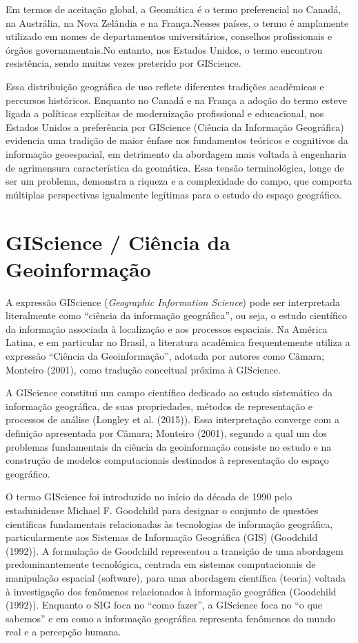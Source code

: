 \documentclass[
  letterpaper,
  DIV=11,
  numbers=noendperiod]{scrreprt}
\begin{document}
Em termos de aceitação global, a Geomática é o termo preferencial no
Canadá, na Austrália, na Nova Zelândia e na França.Nesses países, o
termo é amplamente utilizado em nomes de departamentos universitários,
conselhos profissionais e órgãos governamentais.No entanto, nos Estados
Unidos, o termo encontrou resistência, sendo muitas vezes preterido por
GIScience.

Essa distribuição geográfica de uso reflete diferentes tradições
acadêmicas e percursos históricos. Enquanto no Canadá e na França a
adoção do termo esteve ligada a políticas explícitas de modernização
profissional e educacional, nos Estados Unidos a preferência por
GIScience (Ciência da Informação Geográfica) evidencia uma tradição de
maior ênfase nos fundamentos teóricos e cognitivos da informação
geoespacial, em detrimento da abordagem mais voltada à engenharia de
agrimensura característica da geomática. Essa tensão terminológica,
longe de ser um problema, demonstra a riqueza e a complexidade do campo,
que comporta múltiplas perspectivas igualmente legítimas para o estudo
do espaço geográfico.

\section{GIScience / Ciência da
Geoinformação}\label{giscience-ciuxeancia-da-geoinformauxe7uxe3o}

A expressão GIScience (\emph{Geographic Information Science}) pode ser
interpretada literalmente como ``ciência da informação geográfica'', ou
seja, o estudo científico da informação associada à localização e aos
processos espaciais. Na América Latina, e em particular no Brasil, a
literatura acadêmica frequentemente utiliza a expressão ``Ciência da
Geoinformação'', adotada por autores como Câmara; Monteiro (2001), como
tradução conceitual próxima à GIScience.

A GIScience constitui um campo científico dedicado ao estudo sistemático
da informação geográfica, de suas propriedades, métodos de representação
e processos de análise (Longley et al. (2015)). Essa interpretação
converge com a definição apresentada por Câmara; Monteiro (2001),
segundo a qual um dos problemas fundamentais da ciência da geoinformação
consiste no estudo e na construção de modelos computacionais destinados
à representação do espaço geográfico.

O termo GIScience foi introduzido no início da década de 1990 pelo
estadunidense Michael F. Goodchild para designar o conjunto de questões
científicas fundamentais relacionadas às tecnologias de informação
geográfica, particularmente aos Sistemas de Informação Geográfica (GIS)
(Goodchild (1992)). A formulação de Goodchild representou a transição de
uma abordagem predominantemente tecnológica, centrada em sistemas
computacionais de manipulação espacial (software), para uma abordagem
científica (teoria) voltada à investigação dos fenômenos relacionados à
informação geográfica (Goodchild (1992)). Enquanto o SIG foca no ``como
fazer'', a GIScience foca no ``o que sabemos'' e em como a informação
geográfica representa fenômenos do mundo real e a percepção humana.
\end{document}
